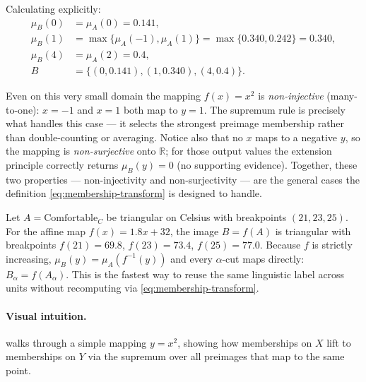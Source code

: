 Calculating explicitly:
\begin{equation}
\begin{aligned}
\mu_B(0) &= \mu_A(0) = 0.141, \\
\mu_B(1) &= \max\{\mu_A(-1), \mu_A(1)\} = \max\{0.340, 0.242\} = 0.340, \\
\mu_B(4) &= \mu_A(2) = 0.4, \\
B &= \{(0, 0.141), (1, 0.340), (4, 0.4)\}.
\end{aligned}
\label{eq:extension_squared_example}
\end{equation}

Even on this very small domain the mapping \(f(x)=x^2\) is \emph{non-injective} (many-to-one): \(x=-1\) and \(x=1\) both map to \(y=1\). The supremum rule is precisely what handles this case --- it selects the strongest preimage membership rather than double-counting or averaging. Notice also that no \(x\) maps to a negative \(y\), so the mapping is \emph{non-surjective} onto \(\mathbb{R}\); for those output values the extension principle correctly returns \(\mu_B(y)=0\) (no supporting evidence). Together, these two properties --- non-injectivity and non-surjectivity --- are the general cases the definition \eqref{eq:membership-transform} is designed to handle.
\begin{tcolorbox}[summarybox, title={Worked example: monotone map (Celsius \(\to\) Fahrenheit)}]
Let \(A=\text{Comfortable}_C\) be triangular on Celsius with breakpoints \((21,23,25)\). For the affine map \(f(x)=1.8x+32\), the image \(B=f(A)\) is triangular with breakpoints \(f(21)=69.8\), \(f(23)=73.4\), \(f(25)=77.0\). Because \(f\) is strictly increasing, \(\mu_B(y)=\mu_A(f^{-1}(y))\) and every \(\alpha\)-cut maps directly: \(B_\alpha = f(A_\alpha)\). This is the fastest way to reuse the same linguistic label across units without recomputing via \eqref{eq:membership-transform}.
\end{tcolorbox}
\paragraph{Visual intuition.}  walks through a simple mapping \(y=x^2\), showing how memberships on \(X\) lift to memberships on \(Y\) via the supremum over all preimages that map to the same point.

